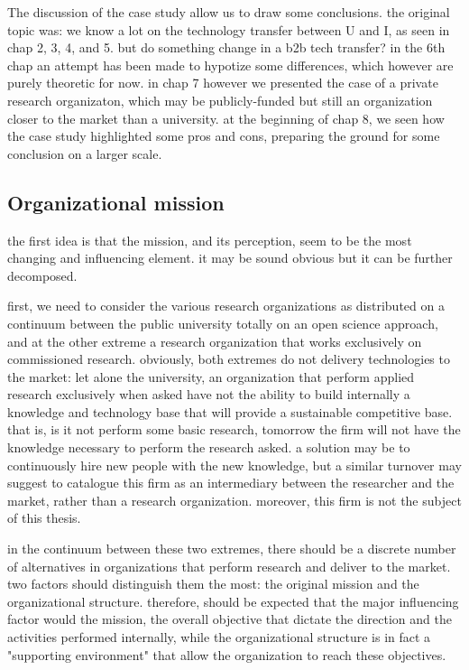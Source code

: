 The discussion of the case study allow us to draw some conclusions. the original topic was: we know a lot on the technology transfer between U and I, as seen in chap 2, 3, 4, and 5. but do something change in a b2b tech transfer? in the 6th chap an attempt has been made to hypotize some differences, which however are purely theoretic for now. in chap 7 however we presented the case of a private research organizaton, which may be publicly-funded but still an organization closer to the market than a university. at the beginning of chap 8, we seen how the case study highlighted some pros and cons, preparing the ground for some conclusion on a larger scale.

\subsection{Organizational mission}

the first idea is that the mission, and its perception, seem to be the most changing and influencing element. it may be sound obvious but it can be further decomposed.

first, we need to consider the various research organizations as distributed on a continuum between the public university totally on an open science approach, and at the other extreme a research organization that works exclusively on commissioned research. obviously, both extremes do not delivery technologies to the market: let alone the university, an organization that perform applied research exclusively when asked have not the ability to build internally a knowledge and technology base that will provide a sustainable competitive base. that is, is it not perform some basic research, tomorrow the firm will not have the knowledge necessary to perform the research asked. a solution may be to continuously hire new people with the new knowledge, but a similar turnover may suggest to catalogue this firm as an intermediary between the researcher and the market, rather than a research organization. moreover, this firm is not the subject of this thesis.

in the continuum between these two extremes, there should be a discrete number of alternatives in organizations that perform research and deliver to the market. two factors should distinguish them the most: the original mission and the organizational structure. therefore, should be expected that the major influencing factor would the mission, the overall objective that dictate the direction and the activities performed internally, while the organizational structure is in fact a "supporting environment" that allow the organization to reach these objectives. 

